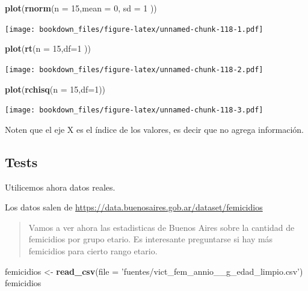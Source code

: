 \documentclass[]{book}
\newenvironment{Shaded}{\begin{snugshade}}{\end{snugshade}}
\newcommand{\DataTypeTok}[1]{\textcolor[rgb]{0.13,0.29,0.53}{#1}}
\newcommand{\DecValTok}[1]{\textcolor[rgb]{0.00,0.00,0.81}{#1}}
\newcommand{\KeywordTok}[1]{\textcolor[rgb]{0.13,0.29,0.53}{\textbf{#1}}}
\newcommand{\NormalTok}[1]{#1}
\newcommand{\StringTok}[1]{\textcolor[rgb]{0.31,0.60,0.02}{#1}}
\begin{document}
\begin{Shaded}
\begin{Highlighting}[]
\KeywordTok{plot}\NormalTok{(}\KeywordTok{rnorm}\NormalTok{(}\DataTypeTok{n =} \DecValTok{15}\NormalTok{,}\DataTypeTok{mean =} \DecValTok{0}\NormalTok{, }\DataTypeTok{sd =} \DecValTok{1}\NormalTok{ ))}
\end{Highlighting}
\end{Shaded}

\texttt{[image: bookdown\_files/figure-latex/unnamed-chunk-118-1.pdf]}

\begin{Shaded}
\begin{Highlighting}[]
\KeywordTok{plot}\NormalTok{(}\KeywordTok{rt}\NormalTok{(}\DataTypeTok{n =} \DecValTok{15}\NormalTok{,}\DataTypeTok{df=}\DecValTok{1}\NormalTok{ ))}
\end{Highlighting}
\end{Shaded}

\texttt{[image: bookdown\_files/figure-latex/unnamed-chunk-118-2.pdf]}

\begin{Shaded}
\begin{Highlighting}[]
\KeywordTok{plot}\NormalTok{(}\KeywordTok{rchisq}\NormalTok{(}\DataTypeTok{n =} \DecValTok{15}\NormalTok{,}\DataTypeTok{df=}\DecValTok{1}\NormalTok{))}
\end{Highlighting}
\end{Shaded}

\texttt{[image: bookdown\_files/figure-latex/unnamed-chunk-118-3.pdf]}

Noten que el eje X es el índice de los valores, es decir que no agrega información.

\hypertarget{tests}{%
\subsection{Tests}\label{tests}}

Utilicemos ahora datos reales.

Los datos salen de \url{https://data.buenosaires.gob.ar/dataset/femicidios}

\begin{quote}
Vamos a ver ahora las estadisticas de Buenos Aires sobre la cantidad de femicidios por grupo etario. Es interesante preguntarse si hay más femicidios para cierto rango etario.
\end{quote}

\begin{Shaded}
\begin{Highlighting}[]
\NormalTok{femicidios <-}\StringTok{ }\KeywordTok{read_csv}\NormalTok{(}\DataTypeTok{file =} \StringTok{'fuentes/vict_fem_annio__g_edad_limpio.csv'}\NormalTok{)}
\NormalTok{femicidios}
\end{Highlighting}
\end{Shaded}
\end{document}
